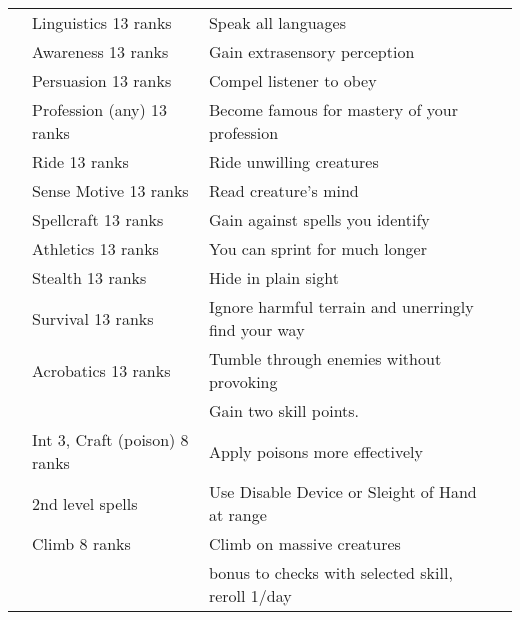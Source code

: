 {\begin{longtabu}{>{\lcol}p{10em} >{\lcol}p{15em} >{\lcol}X >{\lcol}p{3em}}
         & Linguistics 13 ranks & Speak all languages &  \\
         & Awareness 13 ranks & Gain extrasensory perception &  \\
         & Persuasion 13 ranks & Compel listener to obey &  \\
         & Profession (any) 13 ranks & Become famous for mastery of your profession &  \\
         & Ride 13 ranks & Ride unwilling creatures &  \\
         & Sense Motive 13 ranks & Read creature's mind &  \\
         & Spellcraft 13 ranks & Gain  against spells you identify &  \\
         & Athletics 13 ranks & You can sprint for much longer &  \\
         & Stealth 13 ranks & Hide in plain sight &  \\
         & Survival 13 ranks & Ignore harmful terrain and unerringly find your way &  \\
         & Acrobatics 13 ranks & Tumble through enemies without provoking &  \\
         & \x & Gain two skill points.
        &  \\
         & Int 3, Craft (poison) 8 ranks & Apply poisons more effectively &  \\
         &  2nd level spells & Use Disable Device or Sleight of Hand at range &  \\
         & Climb 8 ranks & Climb on massive creatures &  \\
         & \x &   bonus to checks with selected skill, reroll 1/day &  \\

\end{longtabu}}

